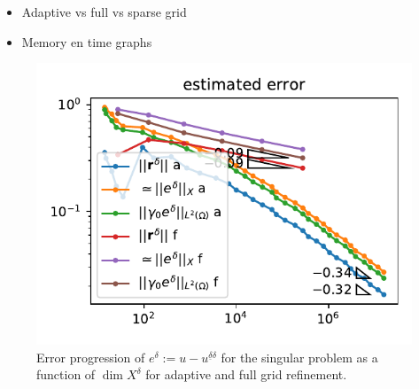 \documentclass[11pt,a4paper,oneside,english]{amsart}
\numberwithin{equation}{section}
\numberwithin{theorem}{section}
\theoremstyle{definition}
\newcommand{\jw}[1]{{\color{red}{JW: #1}}}
\begin{document}
\begin{itemize}
  \item Adaptive vs full vs sparse grid
  \item Memory en time graphs
\end{itemize}
\begin{figure}
  \includegraphics[width=0.5\linewidth]{singular_adaptive_errors}
  \caption{Error progression of $e^\delta := u - u^{\underline{\delta}\delta}$ for the singular problem as
  a function of $\dim X^\delta$ for adaptive and full grid refinement.\jw{excuse the terrible graph}}
  \label{fig:singular}
\end{figure}



 

\end{document}
